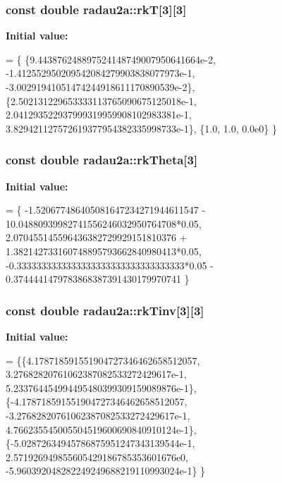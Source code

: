 \subsubsection[{\texorpdfstring{rkT}{rkT}}]{\setlength{\rightskip}{0pt plus 5cm}const double radau2a\+::rkT\mbox{[}3\mbox{]}\mbox{[}3\mbox{]}\hspace{0.3cm}{\ttfamily [static]}}\hypertarget{namespaceradau2a_ac217dadb5a83f73958dba436ae4fa415}{}\label{namespaceradau2a_ac217dadb5a83f73958dba436ae4fa415}
{\bfseries Initial value\+:}
\begin{DoxyCode}
= \{
\{9.443876248897524148749007950641664e-2,
-1.412552950209542084279903838077973e-1,
-3.00291941051474244918611170890539e-2\},
\{2.502131229653333113765090675125018e-1,
2.041293522937999319959908102983381e-1,
3.829421127572619377954382335998733e-1\},
\{1.0,
1.0,
0.0e0\}
\}
\end{DoxyCode}
\subsubsection[{\texorpdfstring{rk\+Theta}{rkTheta}}]{\setlength{\rightskip}{0pt plus 5cm}const double radau2a\+::rk\+Theta\mbox{[}3\mbox{]}\hspace{0.3cm}{\ttfamily [static]}}\hypertarget{namespaceradau2a_a905a164e07054850af60562b36b1aa9f}{}\label{namespaceradau2a_a905a164e07054850af60562b36b1aa9f}
{\bfseries Initial value\+:}
\begin{DoxyCode}
= \{
    -1.520677486405081647234271944611547 - 10.04880939982741556246032950764708*0.05,
    2.070455145596436382729929151810376 + 1.382142733160748895793662840980413*0.05,
    -0.3333333333333333333333333333333333*0.05 - 0.3744441479783868387391430179970741
    \}
\end{DoxyCode}
\subsubsection[{\texorpdfstring{rk\+Tinv}{rkTinv}}]{\setlength{\rightskip}{0pt plus 5cm}const double radau2a\+::rk\+Tinv\mbox{[}3\mbox{]}\mbox{[}3\mbox{]}\hspace{0.3cm}{\ttfamily [static]}}\hypertarget{namespaceradau2a_a967c2bc749d9b8cda1585bf4ee50b1c1}{}\label{namespaceradau2a_a967c2bc749d9b8cda1585bf4ee50b1c1}
{\bfseries Initial value\+:}
\begin{DoxyCode}
=
\{\{4.178718591551904727346462658512057,
3.27682820761062387082533272429617e-1,
5.233764454994495480399309159089876e-1\},
\{-4.178718591551904727346462658512057,
-3.27682820761062387082533272429617e-1,
4.766235545005504519600690840910124e-1\},
\{-5.02872634945786875951247343139544e-1,
2.571926949855605429186785353601676e0,
-5.960392048282249249688219110993024e-1\}
\}
\end{DoxyCode}
